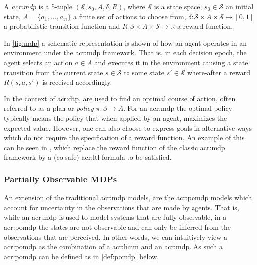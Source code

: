 \begin{definition}
	\label{def:mdp}
	A \textit{\acrfull{acr:mdp}} is a 5-tuple $(\mathcal{S}, s_0, A, \delta, R)$, where $\mathcal{S}$ is a state space, $s_0 \in \mathcal{S}$ an initial state, $A = \{a_1, \ldots, a_m\}$ a finite set of actions to choose from, $\delta: \mathcal{S} \times A \times \mathcal{S} \mapsto [0, 1]$ a probabilistic transition function and $R: \mathcal{S} \times A \times \mathcal{S} \mapsto \mathbb{R}$ a reward function.
\end{definition}

In \autoref{fig:mdp} a schematic representation is shown of how an agent operates in an environment under the \acrshort{acr:mdp} framework.
That is, in each decision epoch, the agent selects an action $a \in A$ and executes it in the environment causing a state transition from the current state $s \in \mathcal{S}$ to some state $s' \in \mathcal{S}$ where-after a reward $R(s, a, s')$ is received accordingly.

In the context of \acrshort{acr:dtp},  are used to find an optimal course of action, often referred to as a plan or \textit{policy} $\pi: \mathcal{S} \mapsto A$.
For an \acrshort{acr:mdp} the optimal policy typically means the policy that when applied by an agent, maximizes the expected value.
However, one can also choose to express goals in alternative ways which do not require the specification of a reward function.
An example of this can be seen in \cite{bhatia2010sampling, lacerda2015optimal}, which replace the reward function of the classic \acrshort{acr:mdp} framework by a (co-safe) \acrfull{acr:ltl} formula to be satisfied.

\subsubsection{Partially Observable MDPs}
\label{sec:pomdps}


An extension of the traditional \acrshort{acr:mdp} models, are the \acrfull{acr:pomdp} models which account for uncertainty in the observations that are made by agents.
That is, while an \acrshort{acr:mdp} is used to model systems that are fully observable, in a \acrshort{acr:pomdp} the states are not observable and can only be inferred from the observations that are perceived.
In other words, we can intuitively view a \acrshort{acr:pomdp} as the combination of a \acrshort{acr:hmm} and an \acrshort{acr:mdp}.
As such a \acrshort{acr:pomdp} can be defined as in \autoref{def:pomdp} below.

